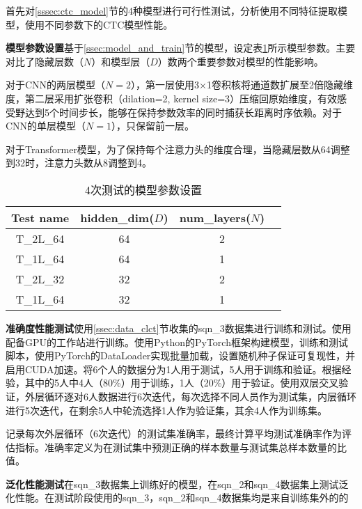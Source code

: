 首先对\ref{sssec:ctc_model}节的4种模型进行可行性测试，分析使用不同特征提取模型，使用不同参数下的CTC模型性能。

\textbf{模型参数设置}\hspace{5pt}基于\ref{ssec:model_and_train}节的模型，设定表\ref{tab:model_para_setting}所示模型参数。主要对比了隐藏层数（$N$）和模型层（$D$）数两个重要参数对模型的性能影响。

对于CNN的两层模型（$N=2$），第一层使用3×1卷积核将通道数扩展至2倍隐藏维度，第二层采用扩张卷积（dilation=2, kernel size=3）压缩回原始维度，有效感受野达到5个时间步长，能够在保持参数效率的同时捕获长距离时序依赖。对于CNN的单层模型（$N=1$），只保留前一层。

对于Transformer模型，为了保持每个注意力头的维度合理，当隐藏层数从64调整到32时，注意力头数从8调整到4。

\begin{table}
    \centering
    \caption{4次测试的模型参数设置}
    \begin{tabular}{cccc}
    \hline
         \textbf{Test name}& \textbf{hidden\_dim($D$)} & \textbf{num\_layers($N$)}\\
         \hline
         T\_2L\_64 & 64 & 2  \\
         T\_1L\_64 & 64 & 1  \\
         T\_2L\_32 & 32 & 2  \\
         T\_1L\_64 & 32 & 1  \\
         \hline
    \end{tabular}
    \label{tab:model_para_setting}
\end{table}

\textbf{准确度性能测试}\hspace{5pt}使用\ref{ssec:data_clct}节收集的sqn\_3数据集进行训练和测试。使用配备GPU的工作站进行训练。使用Python的PyTorch框架构建模型，训练和测试脚本，使用PyTorch的DataLoader实现批量加载，设置随机种子保证可复现性，并启用CUDA加速。将6个人的数据分为1人用于测试，5人用于训练和验证。根据经验，其中的5人中4人（80\%）用于训练，1人（20\%）用于验证。使用双层交叉验证，外层循环逐对6人数据进行6次迭代，每次选择不同人员作为测试集，内层循环进行5次迭代，在剩余5人中轮流选择1人作为验证集，其余4人作为训练集。

记录每次外层循环（6次迭代）的测试集准确率，最终计算平均测试准确率作为评估指标。准确率定义为在测试集中预测正确的样本数量与测试集总样本数量的比值。

\textbf{泛化性能测试}\hspace{5pt}在sqn\_3数据集上训练好的模型，在sqn\_2和sqn\_4数据集上测试泛化性能。在测试阶段使用的sqn\_3，sqn\_2和sqn\_4数据集均是来自训练集外的的

